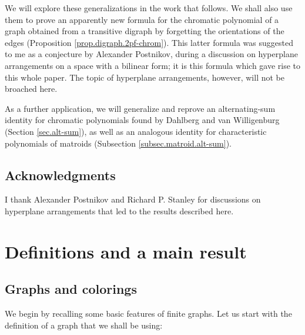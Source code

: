 \documentclass[numbers=enddot,12pt,final,onecolumn,notitlepage]{scrartcl}%
\theoremstyle{definition}
\begin{document}
We will explore these generalizations in the work that follows. We shall also
use them to prove an apparently new formula for the chromatic polynomial of a
graph obtained from a transitive digraph by forgetting the orientations of the
edges (Proposition \ref{prop.digraph.2pf-chrom}). This latter formula was
suggested to me as a conjecture by Alexander Postnikov, during a discussion on
hyperplane arrangements on a space with a bilinear form; it is this formula
which gave rise to this whole paper. The topic of hyperplane arrangements,
however, will not be broached here.

As a further application, we will generalize and reprove an alternating-sum
identity for chromatic polynomials found by Dahlberg and van Willigenburg
(Section \ref{sec.alt-sum}), as well as an analogous identity for
characteristic polynomials of matroids (Subsection
\ref{subsec.matroid.alt-sum}).

\subsection*{Acknowledgments}

I thank Alexander Postnikov and Richard P. Stanley for discussions on
hyperplane arrangements that led to the results described here.

\section{\label{sec.defs-and-main}Definitions and a main result}

\subsection{Graphs and colorings}

We begin by recalling some basic features of finite graphs. Let us start with
the definition of a graph that we shall be using:
\end{document}
